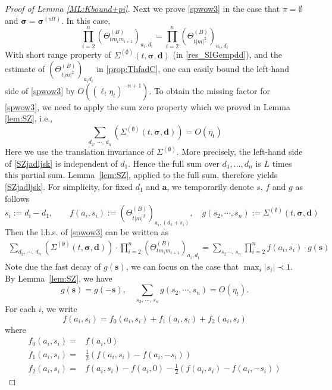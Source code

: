 \documentclass[10pt,reqno]{article}
\theoremstyle{plain} %
\theoremstyle{remark}
\numberwithin{equation}{section}
\begin{document}
\begin{proof}[Proof of Lemma  \ref{ML:Kbound+pi}]
Next we prove \eqref{spwow3}  in the case that $\pi=\emptyset$ and $\boldsymbol{\sigma}=\boldsymbol{\sigma}^{(alt)}$. 
In this case, 
$$
\prod_{i=2}^n \left(\Theta^{(B)}_{tm_im_{i+1}}\right)_{a_i, d_i}
=
\prod_{i=2}^n \left(\Theta^{(B)}_{t|m|^2}\right)_{a_i, d_i} 
$$
With short range property of $\Sigma^{(\emptyset)}(t, \boldsymbol{\sigma}, \textbf{d})$ (in \eqref{res_SIGempdd}), and the estimate of $(\Theta^{(B)}_{t|m|^2})_{a_id_i}$  in \eqref{prop:ThfadC}, one can easily bound the left-hand side of \eqref{spwow3} by 
$ 
  O((\ell_t\eta_t)^{-n+1}) 
$. To obtain the missing factor for \eqref{spwow3}, we need to apply the sum zero property which  we proved in Lemma \ref{lem:SZ}, i.e., 
\begin{equation}\label{SZjadljsk}
   \sum_{d_2,\,\cdots,\,d_n}\left(\Sigma^{(\emptyset)}(t, \boldsymbol{\sigma}, \textbf{d})\right)=O(\eta_t) 
\end{equation}
Here we use the translation invariance of \(\Sigma^{(\emptyset)}\). More precisely, the left-hand side of \eqref{SZjadljsk}
is independent of \(d_1\). Hence the full sum over \(d_1,\ldots,d_n\) is \(L\) times this partial sum. Lemma~\ref{lem:SZ}, applied to the full sum, therefore yields \eqref{SZjadljsk}.  For simplicity, for fixed $d_1$ and $\textbf{a}$, we temporarily denote $s$, $f$ and $g$ as follows 
$$
s_i:=d_i-d_1,\quad \quad f(a_i, s_i):=\left(\Theta^{(B)}_{t|m|^2}\right)_{a_i,(d_1+s_i)}, \quad g(s_2, \cdots,s_n):=\Sigma^{(\emptyset)}(t, \boldsymbol{\sigma}, \textbf{d})$$
Then the l.h.s. of \eqref{spwow3} can be written as 
\begin{align} \label{Kfadgd}
 \sum_{d_2,\,\cdots,\, d_n}\left(\Sigma^{(\emptyset)}(t, \boldsymbol{\sigma}, \textbf{d})\right)
\cdot 
\prod_{i=2}^n \left(\Theta^{(B)}_{tm_im_{i+1}}\right)_{a_i, d_i}
= \sum_{s_2\,\cdots,\,s_n} \prod_{i=2}^nf(a_i, s_i)\cdot g(\textbf{s})
\end{align}
Note due the fast decay of $g(\textbf{s})$, we can focus on the case that $\max_i|s_i|\prec 1$. 
 By Lemma~\ref{lem:SZ},  we have 
$$
g(\textbf{s})=g(-\textbf{s}), \quad 
 \sum_{s_2,\,\cdots,\,s_n} g(s_2, \cdots,s_n) = O(\eta_t).
$$ 
For each $i$, we write 
$$
f(a_i, s_i)=f_0(a_i,s_i)+f_1(a_i,s_i )+f_2(a_i,s_i)
$$
where 
\begin{align}
f_0(a_i,s_i)=&f(a_i,0)
\\\nonumber
f_1(a_i,s_i)=&\frac12\left(f(a_i,s_i)-f(a_i, -s_i)\right)  
\\\nonumber
f_2(a_i,s_i)=&f(a_i,s_i)-f(a_i,0)-\frac12\left(f(a_i,s_i)-f(a_i,-s_i)\right)  
\end{align}

\end{proof}
\end{document}
